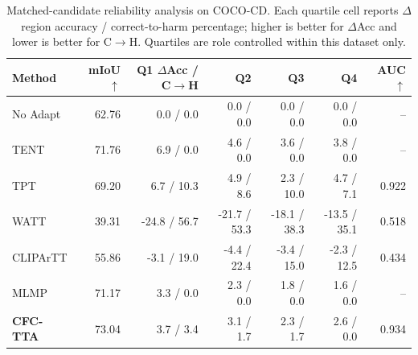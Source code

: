 \begin{table}[t]
\centering
\scriptsize
\setlength{\tabcolsep}{3.2pt}
\caption{Matched-candidate reliability analysis on COCO-CD. Each quartile cell reports $\Delta$ region accuracy / correct-to-harm percentage; higher is better for $\Delta$Acc and lower is better for C$\rightarrow$H. Quartiles are role controlled within this dataset only.}
\label{tab:source-risk-coco-cd}
\begin{tabular}{lrrrrrr}
\toprule
Method & mIoU $\uparrow$ & Q1 $\Delta$Acc / C$\rightarrow$H & Q2 & Q3 & Q4 & AUC $\uparrow$ \\
\midrule
No Adapt & 62.76 & 0.0 / 0.0 & 0.0 / 0.0 & 0.0 / 0.0 & 0.0 / 0.0 & -- \\
TENT & 71.76 & 6.9 / 0.0 & 4.6 / 0.0 & 3.6 / 0.0 & 3.8 / 0.0 & -- \\
TPT & 69.20 & 6.7 / 10.3 & 4.9 / 8.6 & 2.3 / 10.0 & 4.7 / 7.1 & 0.922 \\
WATT & 39.31 & -24.8 / 56.7 & -21.7 / 53.3 & -18.1 / 38.3 & -13.5 / 35.1 & 0.518 \\
CLIPArTT & 55.86 & -3.1 / 19.0 & -4.4 / 22.4 & -3.4 / 15.0 & -2.3 / 12.5 & 0.434 \\
MLMP & 71.17 & 3.3 / 0.0 & 2.3 / 0.0 & 1.8 / 0.0 & 1.6 / 0.0 & -- \\
\textbf{CFC-TTA} & 73.04 & 3.7 / 3.4 & 3.1 / 1.7 & 2.3 / 1.7 & 2.6 / 0.0 & 0.934 \\
\bottomrule
\end{tabular}
\end{table}
